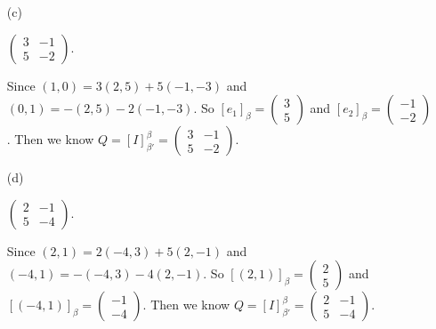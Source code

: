 \begin{Exercise}
\begin{enumerate}[(a)]
\item[(c)]
\begin{answer}
$\begin{pmatrix}
3 & -1 \\
5 & -2
\end{pmatrix}$.
\end{answer}
\begin{solution}
Since $(1,0) = 3(2,5)+5(-1,-3)$ and $(0,1) = -(2,5)-2(-1,-3)$. So $[e_1]_{\beta} = \begin{pmatrix}
3 \\
5
\end{pmatrix}$ and $[e_2]_{\beta} = \begin{pmatrix}
-1 \\
-2
\end{pmatrix}$. Then we know $Q = [I]_{\beta'}^{\beta} = \begin{pmatrix}
3 & -1 \\
5 & -2
\end{pmatrix}$.
\end{solution}

\item[(d)]
\begin{answer}
$\begin{pmatrix}
2 & -1 \\
5 & -4
\end{pmatrix}$.
\end{answer}
\begin{solution}
Since $(2,1) = 2(-4,3)+5(2,-1)$ and $(-4,1) = -(-4,3)-4(2,-1)$. So $[(2,1)]_{\beta} = \begin{pmatrix}
2 \\
5
\end{pmatrix}$ and $[(-4,1)]_{\beta} = \begin{pmatrix}
-1 \\
-4
\end{pmatrix}$. Then we know $Q = [I]_{\beta'}^{\beta} = \begin{pmatrix}
2 & -1 \\
5 & -4
\end{pmatrix}$.
\end{solution}

\end{enumerate}
\end{Exercise}